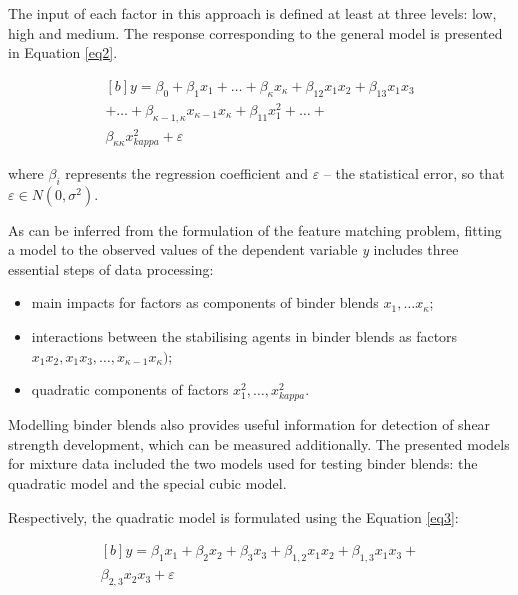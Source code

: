 \documentclass[eprint,
]{actapoly}
\begin{document}
The input of each factor in this approach is defined at least at three levels: low, high and medium. The response corresponding to the general model is presented in Equation \ref{eq2}.

\begin{equation}\label{eq2}
\begin{aligned}[b]
y=\beta_0+\beta_{1}x_{1}+\ldots+\beta_{\kappa}x_{\kappa}+\beta_{12}x_{1}x_{2}+\beta_{13}x_{1}x_3\\
+\ldots+\beta_{\kappa-1,\kappa}x_{\kappa-1}x_{\kappa}+\beta_{11}x_{1}^2+\ldots+ \\\beta_{\kappa\kappa}x_{kappa}^2+\varepsilon
\end{aligned}
\end{equation}

where $\beta_i$ represents the regression coefficient and $\varepsilon$ -- the statistical error, so that $\varepsilon\in N(0,\sigma^2)$.

As can be inferred from the formulation of the feature matching problem, fitting a model to the observed values of the dependent variable \emph{y} includes three essential steps of data processing: 

\begin{itemize}
	\item main impacts for factors as components of binder blends $x_1, \ldots x_\kappa$;
	\item interactions between the stabilising agents in binder blends as factors $x_{1}x_{2}, x_{1}x_{3}, \ldots, x_{\kappa-1}x_{\kappa})$; 
	\item quadratic components of factors $x_{1}^2, \ldots, x_{kappa}^2$. 
\end{itemize}

Modelling binder blends also provides useful information for detection of shear strength development, which can be measured additionally. The presented models for mixture data included the two models used for testing binder blends: the quadratic model and the special cubic model. 

Respectively, the quadratic model is formulated using the Equation \ref{eq3}:

\begin{equation}\label{eq3}
\begin{aligned}[b]
y=\beta_{1}x_{1}+\beta_{2}x_{2}+\beta_{3}x_{3}+\beta_{1,2}x_{1}x_{2}+\beta_{1,3}x_{1}x_{3}+\\\beta_{2,3}x_{2}x_{3}+\varepsilon
\end{aligned}
\end{equation}
\end{document}
